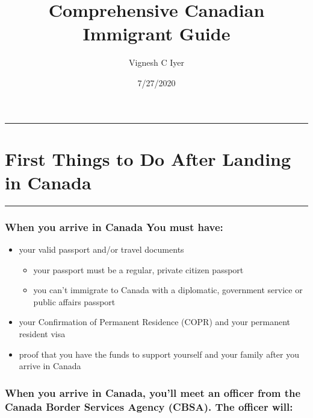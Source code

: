 \documentclass[
]{article}
\title{Comprehensive Canadian Immigrant Guide}
\author{Vignesh C Iyer}
\date{7/27/2020}
\begin{document}
\maketitle

\begin{center}\rule{0.5\linewidth}{0.5pt}\end{center}

\hypertarget{first-things-to-do-after-landing-in-canada}{%
\section{First Things to Do After Landing in
Canada}\label{first-things-to-do-after-landing-in-canada}}

\begin{center}\rule{0.5\linewidth}{0.5pt}\end{center}

\hypertarget{when-you-arrive-in-canada-you-must-have}{%
\subsubsection{When you arrive in Canada You must
have:}\label{when-you-arrive-in-canada-you-must-have}}

\begin{itemize}
\item
  your valid passport and/or travel documents

  \begin{itemize}
  \item
    your passport must be a regular, private citizen passport
  \item
    you can't immigrate to Canada with a diplomatic, government service
    or public affairs passport
  \end{itemize}
\item
  your Confirmation of Permanent Residence (COPR) and your permanent
  resident visa
\item
  proof that you have the funds to support yourself and your family
  after you arrive in Canada
\end{itemize}

\hypertarget{when-you-arrive-in-canada-youll-meet-an-officer-from-the-canada-border-services-agency-cbsa.-the-officer-will}{%
\subsubsection{When you arrive in Canada, you'll meet an officer from
the Canada Border Services Agency (CBSA). The officer
will:}\label{when-you-arrive-in-canada-youll-meet-an-officer-from-the-canada-border-services-agency-cbsa.-the-officer-will}}
\end{document}
